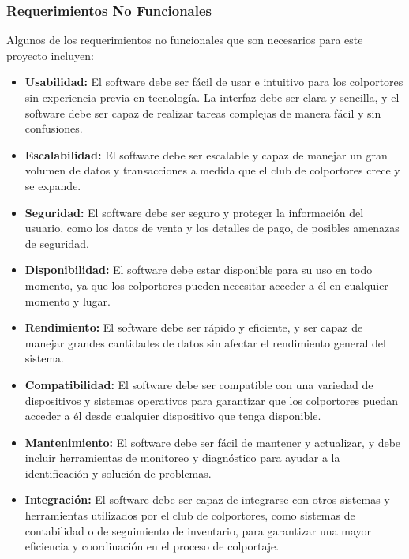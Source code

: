 \documentclass[runningheads]{llncs}
\begin{document}
            \subsubsection{Requerimientos No Funcionales}
                Algunos de los requerimientos no funcionales que son necesarios para este proyecto incluyen:
                \begin{itemize}
                    \item \textbf{Usabilidad: } El software debe ser fácil de usar e intuitivo para los colportores sin experiencia previa en tecnología. La interfaz debe ser clara y sencilla, y el software debe ser capaz de realizar tareas complejas de manera fácil y sin confusiones.
                    \item \textbf{Escalabilidad: } El software debe ser escalable y capaz de manejar un gran volumen de datos y transacciones a medida que el club de colportores crece y se expande.
                    \item \textbf{Seguridad: } El software debe ser seguro y proteger la información del usuario, como los datos de venta y los detalles de pago, de posibles amenazas de seguridad.
                    \item \textbf{Disponibilidad: } El software debe estar disponible para su uso en todo momento, ya que los colportores pueden necesitar acceder a él en cualquier momento y lugar.
                    \item \textbf{Rendimiento: }El software debe ser rápido y eficiente, y ser capaz de manejar grandes cantidades de datos sin afectar el rendimiento general del sistema.
                    \item \textbf{Compatibilidad: } El software debe ser compatible con una variedad de dispositivos y sistemas operativos para garantizar que los colportores puedan acceder a él desde cualquier dispositivo que tenga disponible.
                    \item \textbf{Mantenimiento: } El software debe ser fácil de mantener y actualizar, y debe incluir herramientas de monitoreo y diagnóstico para ayudar a la identificación y solución de problemas.
                    \item \textbf{Integración: } El software debe ser capaz de integrarse con otros sistemas y herramientas utilizados por el club de colportores, como sistemas de contabilidad o de seguimiento de inventario, para garantizar una mayor eficiencia y coordinación en el proceso de colportaje.
                \end{itemize}
\end{document}
